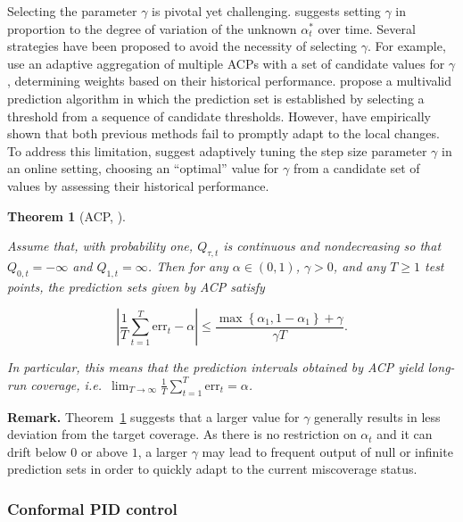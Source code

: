 \documentclass[
  11pt,
  a4paper,
]{article}
\theoremstyle{plain}
\theoremstyle{plain}
\newtheorem{theorem}{Theorem}[section]
\theoremstyle{remark}
\begin{document}
Selecting the parameter \(\gamma\) is pivotal yet challenging.
\textcite{gibbs2021} suggests setting \(\gamma\) in proportion to the
degree of variation of the unknown \(\alpha_{t}^{*}\) over time. Several
strategies have been proposed to avoid the necessity of selecting
\(\gamma\). For example, \textcite{zaffran2022} use an adaptive
aggregation of multiple ACPs with a set of candidate values for
\(\gamma\) , determining weights based on their historical performance.
\textcite{bastani2022} propose a multivalid prediction algorithm in
which the prediction set is established by selecting a threshold from a
sequence of candidate thresholds. However, \textcite{gibbs2024} have
empirically shown that both previous methods fail to promptly adapt to
the local changes. To address this limitation, \textcite{gibbs2024}
suggest adaptively tuning the step size parameter \(\gamma\) in an
online setting, choosing an ``optimal'' value for \(\gamma\) from a
candidate set of values by assessing their historical performance.

\begin{theorem}[ACP,
\textcite{gibbs2021}]\protect\hypertarget{thm-acp}{}\label{thm-acp}

Assume that, with probability one, \(Q_{\tau, t}\) is continuous and
nondecreasing so that \(Q_{0, t}=-\infty\) and \(Q_{1, t}=\infty\). Then
for any \(\alpha\in(0,1)\), \(\gamma > 0\), and any \(T \geq 1\) test
points, the prediction sets given by ACP satisfy

\[
|\frac{1}{T}\sum_{t=1}^{T}\mathrm{err}_t - \alpha| \leq \frac{\max\left\{\alpha_1,1-\alpha_1\right\}+\gamma}{\gamma T}.
\]

In particular, this means that the prediction intervals obtained by ACP
yield long-run coverage,
i.e.~\(\lim _{T \rightarrow \infty} \frac{1}{T} \sum_{t=1}^T \mathrm{err}_t = \alpha\).

\end{theorem}

\textbf{Remark.} Theorem~\ref{thm-acp} suggests that a larger value for
\(\gamma\) generally results in less deviation from the target coverage.
As there is no restriction on \(\alpha_t\) and it can drift below \(0\)
or above \(1\), a larger \(\gamma\) may lead to frequent output of null
or infinite prediction sets in order to quickly adapt to the current
miscoverage status.

\subsubsection{Conformal PID control}\label{conformal-pid-control}
\end{document}
